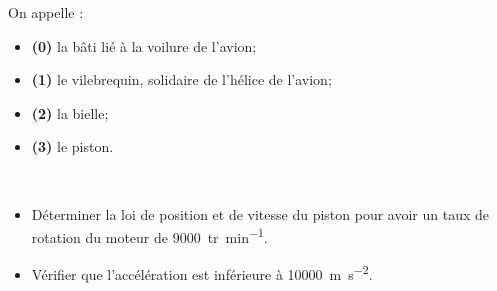 \documentclass[10pt,fleqn]{article} %
\begin{document}
\begin{multicols}{2}
On appelle : 
\begin{itemize}
\item \textbf{(0)} la bâti lié à la voilure de l'avion;
\item \textbf{(1)} le vilebrequin, solidaire de l'hélice de l'avion;
\item \textbf{(2)} la bielle;
\item \textbf{(3)} le piston.
\end{itemize}

\begin{obj} ~\\
\begin{itemize}
\item Déterminer la loi de position et de vitesse du piston pour avoir un taux de rotation du moteur de \SI{9000}{tr.min^{-1}}.
\item Vérifier que l'accélération est inférieure à \SI{10000}{m.s^{-2}}.
\end{itemize}
\end{obj}



\end{multicols}
\end{document}
